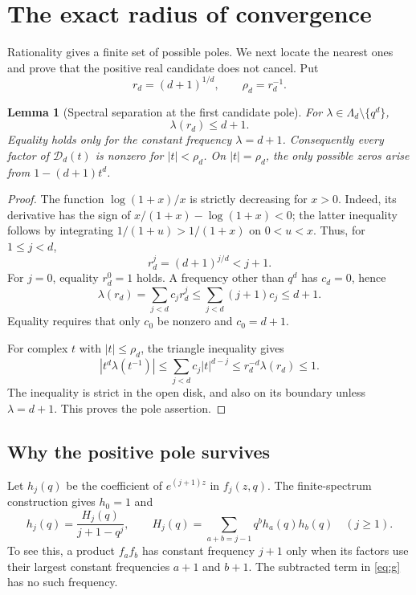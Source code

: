 \documentclass[11pt,letterpaper]{article}
\numberwithin{equation}{section}
\newtheorem{lemma}[theorem]{Lemma}
\theoremstyle{definition}
\theoremstyle{remark}
\newcommand{\Spec}{\Lambda}
\begin{document}
\section{The exact radius of convergence}\label{sec:growth}
Rationality gives a finite set of possible poles. We next locate the
nearest ones and prove that the positive real candidate does not cancel.
Put
\begin{equation}\label{eq:rho}
 r_d=(d+1)^{1/d},\qquad \rho_d=r_d^{-1}.
\end{equation}

\begin{lemma}[Spectral separation at the first candidate pole]\label{lem:separation}
For $\lambda\in\Spec_d\setminus\{q^d\}$,
\[
 \lambda(r_d)\le d+1.
\]
Equality holds only for the constant frequency $\lambda=d+1$.
Consequently every factor of $\mathcal D_d(t)$ is nonzero for
$|t|<\rho_d$. On $|t|=\rho_d$, the only possible zeros arise from
$1-(d+1)t^d$.
\end{lemma}
\begin{proof}
The function $\log(1+x)/x$ is strictly decreasing for $x>0$.
Indeed, its derivative has the sign of
$x/(1+x)-\log(1+x)<0$; the latter inequality follows by integrating
$1/(1+u)>1/(1+x)$ on $0<u<x$.
Thus, for $1\le j<d$,
\[
 r_d^j=(d+1)^{j/d}<j+1.
\]
For $j=0$, equality $r_d^0=1$ holds.
A frequency other than $q^d$ has $c_d=0$, hence
\[
 \lambda(r_d)=\sum_{j<d}c_jr_d^j
       \le\sum_{j<d}(j+1)c_j\le d+1.
\]
Equality requires that only $c_0$ be nonzero and $c_0=d+1$.

For complex $t$ with $|t|\le\rho_d$, the triangle inequality gives
\[
 |t^d\lambda(t^{-1})|
 \le\sum_{j<d}c_j|t|^{d-j}
 \le r_d^{-d}\lambda(r_d)\le1.
\]
The inequality is strict in the open disk, and also on its boundary
unless $\lambda=d+1$. This proves the pole assertion.
\end{proof}

\subsection{Why the positive pole survives}
Let $h_j(q)$ be the coefficient of $e^{(j+1)z}$ in $f_j(z,q)$.
The finite-spectrum construction gives $h_0=1$ and
\begin{equation}\label{eq:hrecurrence}
 h_j(q)=\frac{H_j(q)}{j+1-q^j},\qquad
 H_j(q)=\sum_{a+b=j-1}q^b h_a(q)h_b(q)\quad(j\ge1).
\end{equation}
To see this, a product $f_af_b$ has constant frequency $j+1$ only when
its factors use their largest constant frequencies $a+1$ and $b+1$.
The subtracted term in \eqref{eq:g} has no such frequency.
\end{document}
